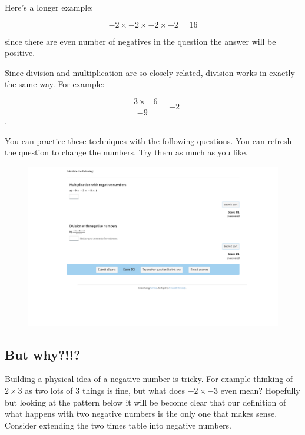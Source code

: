 \documentclass[
  a4paper,
]{scrbook}
\begin{document}
Here's a longer example:

\[
-2 \times -2 \times -2 \times -2 = 16 
\]

since there are even number of negatives in the question the answer will
be positive.

Since division and multiplication are so closely related, division works
in exactly the same way. For example:

\[
\frac{-3 \times -6}{-9} = -2 
\].

You can practice these techniques with the following questions. You can
refresh the question to change the numbers. Try them as much as you
like.

\begin{figure}

{\centering 

\href{https://numbas.mathcentre.ac.uk/question/125598/negative-numbers-multiplication-and-division/embed/}{\includegraphics{./01-negative_numbers_files/figure-pdf/unnamed-chunk-2-1.png}}

}

\end{figure}

\hypertarget{but-why}{%
\subsection{But why?!!?}\label{but-why}}

Building a physical idea of a negative number is tricky. For example
thinking of \(2 \times 3\) as two lots of 3 things is fine, but what
does \(-2 \times -3\) even mean? Hopefully but looking at the pattern
below it will be become clear that our definition of what happens with
two negative numbers is the only one that makes sense. Consider
extending the two times table into negative numbers.
\end{document}
